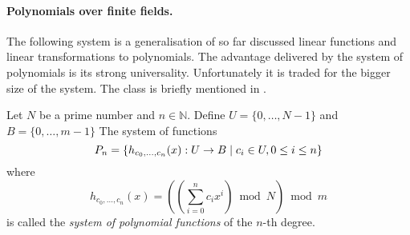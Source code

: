 \paragraph{Polynomials over finite fields.}
The following system is a generalisation of so far discussed linear functions and linear transformations to polynomials. The advantage delivered by the system of polynomials is its strong universality. Unfortunately it is traded for the bigger size of the system. The class is briefly mentioned in \cite{1382617}.

\begin{definition}
Let $N$ be a prime number and $n \in \mathbb{N}$. Define $U = \{0, \dots, N - 1 \}$ and $B = \{0, \dots, m - 1\}$ The system of functions \[ P_n = \left\lbrace h_{c_0, \dots, c_n}(x): U \rightarrow B \mid c_i \in U, 0 \leq i \leq n \right\rbrace \] where \[ h_{c_0, \dots, c_n}(x) = \left( \left(\displaystyle \sum_{i=0}^{n} c_i x^i \right) \bmod N \right) \bmod m \] is called the \emph{system of polynomial functions} of the $n$-th degree.
\end{definition}


